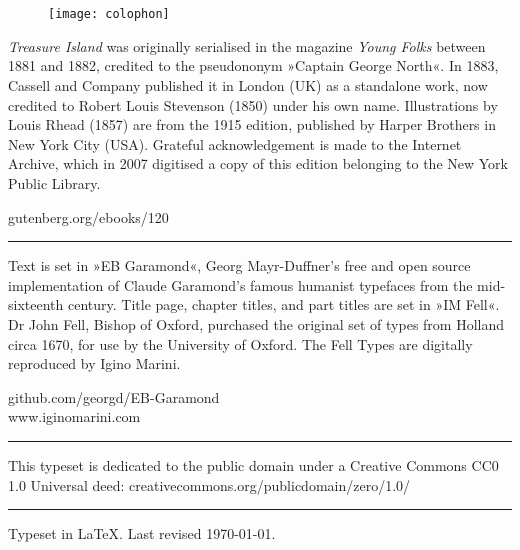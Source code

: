 \documentclass[
a5paper,
]{scrbook} %
\begin{document}
\chapter*{}
\begin{figure}[t!]
\centering
\texttt{[image: colophon]}
\end{figure}
\centering
\vfill
\begin{minipage}{\textwidth}
\textit{Treasure Island} was originally serialised in the magazine \textit{Young Folks} between 1881 and 1882, credited to the pseudononym »Captain George North«. In 1883, Cassell and Company published it in London (UK) as a standalone work, now credited to Robert Louis Stevenson (1850) under his own name. Illustrations by Louis Rhead (1857) are from the 1915 edition, published by Harper Brothers in New York City (USA). Grateful acknowledgement is made to the Internet Archive, which in 2007 digitised a copy of this edition belonging to the New York Public Library.
\end{minipage}
\vfill
gutenberg.org/ebooks/120
\vfill
\rule{0.5\textwidth}{.4pt}
\vfill
\begin{minipage}{\textwidth}
Text is set in »EB Garamond«, Georg Mayr-Duffner's free and open source implementation of Claude Garamond’s famous humanist typefaces from the mid-sixteenth century. Title page, chapter titles, and part titles are set in »IM Fell«. Dr John Fell, Bishop of Oxford, purchased the original set of types from Holland circa 1670, for use by the University of Oxford. The Fell Types are digitally reproduced by Igino Marini. 
\end{minipage}
\vfill
github.com/georgd/EB-Garamond\\
www.iginomarini.com
\vfill
\rule{0.5\textwidth}{.4pt}
\vfill
\begin{minipage}{\textwidth}
This typeset is dedicated to the public domain under a Creative Commons CC0 1.0 Universal deed: creativecommons.org/publicdomain/zero/1.0/
\end{minipage}
\vfill
\rule{0.5\textwidth}{.4pt}
\vfill
Typeset in \LaTeX{}. Last revised \today.
\enlargethispage{2\baselineskip}
\thispagestyle{empty}
\end{document}
